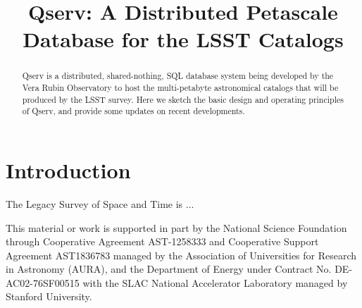 \documentclass[11pt,twoside]{article}
\begin{document}

\title{Qserv: A Distributed Petascale Database for the LSST Catalogs}



\begin{abstract}
Qserv is a distributed, shared-nothing, SQL database system being developed by the Vera Rubin Observatory to
host the multi-petabyte astronomical catalogs that will be produced by the LSST survey.  Here we sketch the
basic design and operating principles of Qserv, and provide some updates on recent developments.
\end{abstract}

\section{Introduction}

The Legacy Survey of Space and Time \citep{2019ApJ...873..111I} is ...

\acknowledgements This material or work is supported in part by the National Science Foundation through
Cooperative Agreement AST-1258333 and Cooperative Support Agreement AST1836783 managed by the Association of
Universities for Research in Astronomy (AURA), and the Department of Energy under Contract No.
DE-AC02-76SF00515 with the SLAC National Accelerator Laboratory managed by Stanford University.


\end{document}
